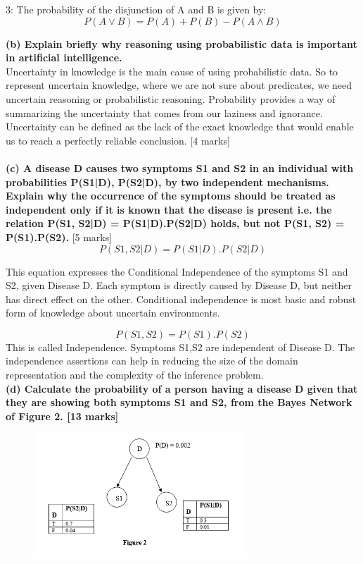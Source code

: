 \documentclass[12pt,a4paper]{article}
\begin{document}
    3: The probability of the disjunction of A and B is given by:
  \begin{equation}
  P(A \lor B) = P(A) + P(B) - P(A \land B)
  \end{equation}
    

	\textbf{(b)	Explain briefly why reasoning using probabilistic data is important in artificial intelligence.}\\
	Uncertainty in knowledge  is the main cause of using probabilistic data. So to represent uncertain knowledge, where we are not sure about predicates, we need uncertain reasoning or probabilistic reasoning. Probability provides a way of summarizing the uncertainty that comes from our laziness
	and ignorance. Uncertainty can be defined as the lack of the exact knowledge that would enable
	us to reach a perfectly reliable conclusion.
	[4 marks]\\
	\\
	\textbf{(c)	A disease D causes two symptoms S1 and S2 in an individual with probabilities P(S1|D), P(S2|D), by two independent mechanisms. Explain why the occurrence of the symptoms should be treated as independent only if it is known that the disease is present i.e. the relation P(S1, S2|D) = P(S1|D).P(S2|D) holds, but not P(S1, S2) = P(S1).P(S2).}
	[5 marks]\\
	
	
	\begin{equation}
	P(S1,S2|D) = P(S1|D).P(S2|D)
	\end{equation}
	
	This equation expresses the Conditional Independence of the symptoms S1 and S2, given Disease D. Each symptom is directly caused by
	Disease D, but neither has direct effect on the other. Conditional independence is most basic and robust form of knowledge about uncertain environments.
	
	


	
	\begin{equation}
	P(S1,S2)=P(S1).P(S2)
	\end{equation}
	This is called Independence. Symptoms S1,S2 are independent of Disease D. The independence assertions can help in reducing
	the size of the domain representation and the complexity of the inference problem.
	\\
	
	
	\textbf{(d)	Calculate the probability of a person having a disease D given that they are showing both symptoms S1 and S2, from the Bayes Network of Figure 2.
	[13 marks]}
\begin{figure}[h]
\includegraphics[width=80mm]{q6.png}
\end{figure}
\end{document}
